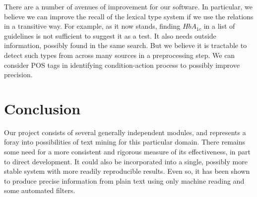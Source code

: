 \documentclass[12pt,letterpaper]{article}
\begin{document}
There are a number of avenues of improvement for our software. In particular, we believe we can improve the recall of the lexical type system if we use the relations in a transitive way. For example, as it now stands, finding $HbA_{1c}$ in a list of guidelines is not sufficient to suggest it as a test. It also needs outside information, possibly found in the same search. But we believe it is tractable to detect such types from across many sources in a preprocessing step. We can consider POS tags in identifying condition-action process to possibly improve precision. 

\section{Conclusion}

Our project consists of several generally independent modules, and represents a foray into possibilities of text mining for this particular domain. There remains some need for a more consistent and rigorous measure of its effectiveness, in part to direct development. It could also be incorporated into a single, possibly more stable system with more readily reproducible results. Even so, it has been shown to produce precise information from plain text using only machine reading and some automated filters.



\end{document}
